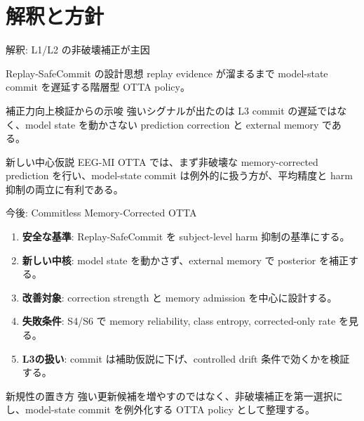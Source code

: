 \documentclass[unicode,aspectratio=169,12pt]{beamer}
\begin{document}
\section{解釈と方針}

\begin{frame}{解釈: L1/L2 の非破壊補正が主因}
  \begin{block}{Replay-SafeCommit の設計思想}
    replay evidence が溜まるまで model-state commit を遅延する階層型 OTTA policy。
  \end{block}
  \vspace{0.6em}
  \begin{alertblock}{補正力向上検証からの示唆}
    強いシグナルが出たのは L3 commit の遅延ではなく、\alert{model state を動かさない prediction correction と external memory} である。
  \end{alertblock}
  \vspace{0.6em}
  \begin{block}{新しい中心仮説}
    EEG-MI OTTA では、まず非破壊な memory-corrected prediction を行い、model-state commit は例外的に扱う方が、平均精度と harm 抑制の両立に有利である。
  \end{block}
\end{frame}

\begin{frame}{今後: Commitless Memory-Corrected OTTA}
  \begin{enumerate}
    \item \textbf{安全な基準}: Replay-SafeCommit を subject-level harm 抑制の基準にする。
    \item \textbf{新しい中核}: model state を動かさず、external memory で posterior を補正する。
    \item \textbf{改善対象}: correction strength と memory admission を中心に設計する。
    \item \textbf{失敗条件}: S4/S6 で memory reliability, class entropy, corrected-only rate を見る。
    \item \textbf{L3の扱い}: commit は補助仮説に下げ、controlled drift 条件で効くかを検証する。
  \end{enumerate}
  \vspace{0.5em}
  \begin{block}{新規性の置き方}
    強い更新候補を増やすのではなく、非破壊補正を第一選択にし、model-state commit を例外化する OTTA policy として整理する。
  \end{block}
\end{frame}
\end{document}

